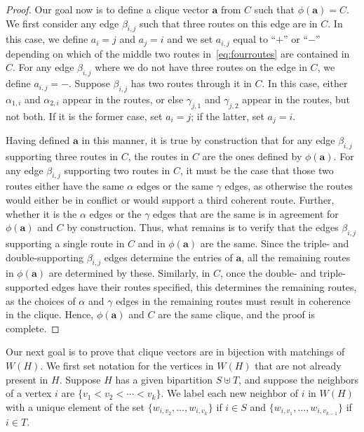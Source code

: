\documentclass[12pt]{amsart}
\theoremstyle{definition}
\newcommand\ba{\mathbf{a}}
\begin{document}
\begin{proof}
Our goal now is to define a clique vector $\ba$ from $C$ such that $\phi(\ba)=C$.
We first consider any edge $\beta_{i,j}$ such that three routes on this edge are in $C$.
In this case, we define $a_i=j$ and $a_j=i$ and we set $a_{i,j}$ equal to ``$+$'' or ``$-$'' depending on which of the middle two routes in~\eqref{eq:fourroutes} are contained in $C$.
For any edge $\beta_{i,j}$ where we do not have three routes on the edge in $C$, we define $a_{i,j}=-$.
Suppose $\beta_{i,j}$ has two routes through it in $C$. 
In this case, either $\alpha_{1,i}$ and $\alpha_{2,i}$ appear in the routes, or else $\gamma_{j,1}$ and $\gamma_{j,2}$ appear in the routes, but not both.
If it is the former case, set $a_i=j$; if the latter, set $a_j=i$.

Having defined $\ba$ in this manner, it is true by construction that for any edge $\beta_{i,j}$ supporting three routes in $C$, the routes in $C$ are the ones defined by $\phi(\ba)$.
For any edge $\beta_{i,j}$ supporting two routes in $C$, it must be the case that those two routes either have the same $\alpha$ edges or the same $\gamma$ edges, as otherwise the routes would either be in conflict or would support a third coherent route.
Further, whether it is the $\alpha$ edges or the $\gamma$ edges that are the same is in agreement for $\phi(\ba)$ and $C$ by construction.
Thus, what remains is to verify that the edges $\beta_{i,j}$ supporting a single route in $C$ and in $\phi(\ba)$ are the same.
Since the triple- and double-supporting $\beta_{i,j}$ edges determine the entries of $\ba$, all the remaining routes in $\phi(\ba)$ are determined by these.
Similarly, in $C$, once the double- and triple-supported edges have their routes specified, this determines the remaining routes, as the choices of $\alpha$ and $\gamma$ edges in the remaining routes must result in coherence in the clique.
Hence, $\phi(\ba)$ and $C$ are the same clique, and the proof is complete.
\end{proof}

Our next goal is to prove that clique vectors are in bijection with matchings of $W(H)$.
We first set notation for the vertices in $W(H)$ that are not already present in $H$.
Suppose $H$ has a given bipartition $S\uplus T$, and suppose the neighbors of a vertex $i$ are $\{v_1<v_2<\cdots <v_k\}$.
We label each new neighbor of $i$ in $W(H)$ with a unique element of the set $\{w_{i,v_2},\dots,w_{i,v_k}\}$ if $i \in S$ and $\{w_{i,v_1},\dots,w_{i,v_{k-1}}\}$ if $i \in T$.
\end{document}
